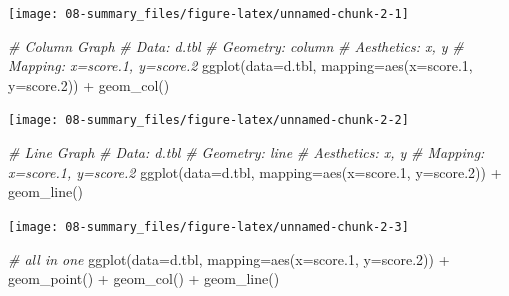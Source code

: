 \documentclass[
]{book}
\newenvironment{Shaded}{\begin{snugshade}}{\end{snugshade}}
\newcommand{\AttributeTok}[1]{\textcolor[rgb]{0.77,0.63,0.00}{#1}}
\newcommand{\CommentTok}[1]{\textcolor[rgb]{0.56,0.35,0.01}{\textit{#1}}}
\newcommand{\FloatTok}[1]{\textcolor[rgb]{0.00,0.00,0.81}{#1}}
\newcommand{\FunctionTok}[1]{\textcolor[rgb]{0.00,0.00,0.00}{#1}}
\newcommand{\NormalTok}[1]{#1}
\newcommand{\SpecialCharTok}[1]{\textcolor[rgb]{0.00,0.00,0.00}{#1}}
\begin{document}
\begin{center}\texttt{[image: 08-summary\_files/figure-latex/unnamed-chunk-2-1]} \end{center}

\begin{Shaded}
\begin{Highlighting}[]
\CommentTok{\# Column Graph}
\CommentTok{\#   Data: d.tbl}
\CommentTok{\#   Geometry: column}
\CommentTok{\#   Aesthetics: x, y}
\CommentTok{\#   Mapping: x=score.1, y=score.2}
\FunctionTok{ggplot}\NormalTok{(}\AttributeTok{data=}\NormalTok{d.tbl, }\AttributeTok{mapping=}\FunctionTok{aes}\NormalTok{(}\AttributeTok{x=}\NormalTok{score}\FloatTok{.1}\NormalTok{, }\AttributeTok{y=}\NormalTok{score}\FloatTok{.2}\NormalTok{)) }\SpecialCharTok{+} \FunctionTok{geom\_col}\NormalTok{()}
\end{Highlighting}
\end{Shaded}

\begin{center}\texttt{[image: 08-summary\_files/figure-latex/unnamed-chunk-2-2]} \end{center}

\begin{Shaded}
\begin{Highlighting}[]
\CommentTok{\# Line Graph}
\CommentTok{\#   Data: d.tbl}
\CommentTok{\#   Geometry: line}
\CommentTok{\#   Aesthetics: x, y}
\CommentTok{\#   Mapping: x=score.1, y=score.2}
\FunctionTok{ggplot}\NormalTok{(}\AttributeTok{data=}\NormalTok{d.tbl, }\AttributeTok{mapping=}\FunctionTok{aes}\NormalTok{(}\AttributeTok{x=}\NormalTok{score}\FloatTok{.1}\NormalTok{, }\AttributeTok{y=}\NormalTok{score}\FloatTok{.2}\NormalTok{)) }\SpecialCharTok{+} \FunctionTok{geom\_line}\NormalTok{()}
\end{Highlighting}
\end{Shaded}

\begin{center}\texttt{[image: 08-summary\_files/figure-latex/unnamed-chunk-2-3]} \end{center}

\begin{Shaded}
\begin{Highlighting}[]
\CommentTok{\# all in one}
\FunctionTok{ggplot}\NormalTok{(}\AttributeTok{data=}\NormalTok{d.tbl, }\AttributeTok{mapping=}\FunctionTok{aes}\NormalTok{(}\AttributeTok{x=}\NormalTok{score}\FloatTok{.1}\NormalTok{, }\AttributeTok{y=}\NormalTok{score}\FloatTok{.2}\NormalTok{)) }\SpecialCharTok{+} 
  \FunctionTok{geom\_point}\NormalTok{() }\SpecialCharTok{+} \FunctionTok{geom\_col}\NormalTok{() }\SpecialCharTok{+} \FunctionTok{geom\_line}\NormalTok{()}
\end{Highlighting}
\end{Shaded}
\end{document}
